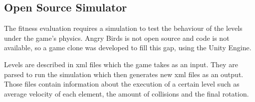 \subsection{Open Source Simulator}

The fitness evaluation requires a simulation to test the behaviour of the levels under the game's physics. Angry Birds is not open source and code is not available, so a game clone was developed to fill this gap, using the Unity Engine. 

Levels are described in xml files which the game takes as an input. They are parsed to run the simulation which then generates new xml files as an output. Those files contain information about the execution of a certain level such as average velocity of each element, the amount of collisions and the final rotation. 
